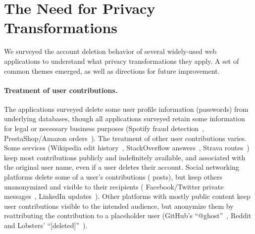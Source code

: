 \section{The Need for Privacy Transformations}
\label{sec:survey}

%
We surveyed the account deletion behavior of several widely-used web applications
to understand what privacy transformations they apply.
%
A set of common themes emerged, as well as directions for future improvement.


\paragraph{Treatment of user contributions.}

The applications surveyed delete some user profile information (\eg passwords)
from underlying databases, though all applications surveyed retain some
information for legal or necessary business purposes (\eg Spotify fraud
detection~\cite{spotify:privacy}, PrestaShop/Amazon
orders~\cite{amazon:privacy, prestashop:privacy}). The treatment of other user
contributions varies.
%
Some services (\eg Wikipedia edit
history~\cite{wikipedia:privacy}, StackOverflow
answers~\cite{stackoverflow:privacy}, Strava routes~\cite{strava:privacy})
keep most contributions publicly and indefinitely available, and associated with the
original user name, even if a user deletes their account.
%
Social networking platforms delete some of a user's contributions (\eg
posts), but keep others unanonymized and visible to their recipients (\eg
Facebook/Twitter private messages~\cite{facebook:privacy, twitter:privacy},
LinkedIn updates~\cite{linkedin:privacy}).
%
Other platforms with mostly public content keep user contributions visible to the intended
audience, but anonymize them by reattributing the contribution to a placeholder user
(\eg GitHub's ``@ghost''~\cite{github:privacy}, Reddit and Lobsters'
``[deleted]''~\cite{reddit:privacy, lobsters:privacy}).
%
%

